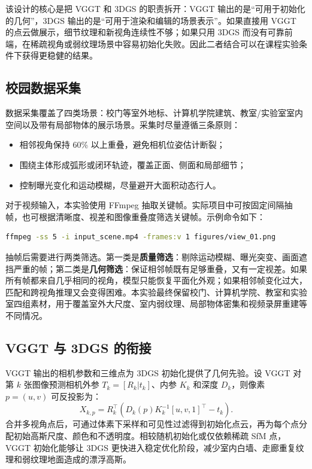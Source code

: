 \documentclass[12pt, a4paper]{article}
\begin{document}
该设计的核心是把 VGGT 和 3DGS 的职责拆开：VGGT 输出的是“可用于初始化的几何”，3DGS 输出的是“可用于渲染和编辑的场景表示”。如果直接用 VGGT 的点云做展示，细节纹理和新视角连续性不够；如果只用 3DGS 而没有可靠前端，在稀疏视角或弱纹理场景中容易初始化失败。因此二者结合可以在课程实验条件下获得更稳健的结果。

\subsection{校园数据采集}

数据采集覆盖了四类场景：校门等室外地标、计算机学院建筑、教室/实验室室内空间以及带有局部物体的展示场景。采集时尽量遵循三条原则：
\begin{itemize}
  \item 相邻视角保持 60\% 以上重叠，避免相机位姿估计断裂；
  \item 围绕主体形成弧形或闭环轨迹，覆盖正面、侧面和局部细节；
  \item 控制曝光变化和运动模糊，尽量避开大面积动态行人。
\end{itemize}

对于视频输入，本实验使用 FFmpeg 抽取关键帧。实际项目中可按固定间隔抽帧，也可根据清晰度、视差和图像重叠度筛选关键帧。示例命令如下：

\begin{lstlisting}[language=bash, caption={从校园重建视频中抽取代表视角}]
ffmpeg -ss 5 -i input_scene.mp4 -frames:v 1 figures/view_01.png
\end{lstlisting}

抽帧后需要进行两类筛选。第一类是\textbf{质量筛选}：剔除运动模糊、曝光突变、画面遮挡严重的帧；第二类是\textbf{几何筛选}：保证相邻帧既有足够重叠，又有一定视差。如果所有帧都来自几乎相同的视角，模型只能恢复平面化外观；如果相邻帧变化过大，匹配和跨视角推理又会变得困难。本实验最终保留校门、计算机学院、教室和实验室四组素材，用于覆盖室外大尺度、室内弱纹理、局部物体密集和视频录屏重建等不同情况。

\subsection{VGGT 与 3DGS 的衔接}

VGGT 输出的相机参数和三维点为 3DGS 初始化提供了几何先验。设 VGGT 对第 $k$ 张图像预测相机外参 $T_k=[R_k|t_k]$、内参 $K_k$ 和深度 $D_k$，则像素 $p=(u,v)$ 可反投影为：
\begin{equation}
  X_{k,p}=R_k^\top\left(D_k(p)K_k^{-1}[u,v,1]^\top-t_k\right).
\end{equation}
合并多视角点后，可通过体素下采样和可见性过滤得到初始化点云，再为每个点分配初始高斯尺度、颜色和不透明度。相较随机初始化或仅依赖稀疏 SfM 点，VGGT 初始化能够让 3DGS 更快进入稳定优化阶段，减少室内白墙、走廊重复纹理和弱纹理地面造成的漂浮高斯。
\end{document}
